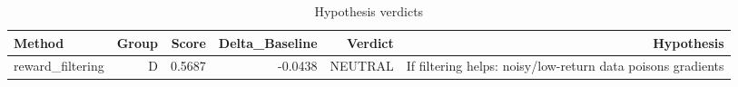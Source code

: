 \begin{table}[htbp]
\centering
\caption{Hypothesis verdicts}
\label{tab:hyp-verdicts}
\begin{tabular}{lrrrrr}
\toprule
\textbf{Method} & \textbf{Group} & \textbf{Score} & \textbf{Delta\_Baseline} & \textbf{Verdict} & \textbf{Hypothesis} \\
\midrule
reward\_filtering & D & 0.5687 & -0.0438 & NEUTRAL & If filtering helps: noisy/low-return data poisons gradients \\
\bottomrule
\end{tabular}
\end{table}